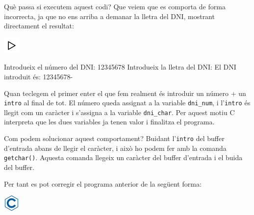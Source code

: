\documentclass[]{book}
\newenvironment{Shaded}{\begin{snugshade}}{\end{snugshade}}
\newcommand{\DataTypeTok}[1]{\textcolor[rgb]{0.13,0.29,0.53}{#1}}
\newcommand{\DecValTok}[1]{\textcolor[rgb]{0.00,0.00,0.81}{#1}}
\newcommand{\SpecialCharTok}[1]{\textcolor[rgb]{0.00,0.00,0.00}{#1}}
\newcommand{\StringTok}[1]{\textcolor[rgb]{0.31,0.60,0.02}{#1}}
\newcommand{\ImportTok}[1]{#1}
\newcommand{\CommentTok}[1]{\textcolor[rgb]{0.56,0.35,0.01}{\textit{#1}}}
\newcommand{\ControlFlowTok}[1]{\textcolor[rgb]{0.13,0.29,0.53}{\textbf{#1}}}
\newcommand{\PreprocessorTok}[1]{\textcolor[rgb]{0.56,0.35,0.01}{\textit{#1}}}
\newcommand{\NormalTok}[1]{#1}
\begin{document}
Què passa si executem aquest codi? Que veiem que es comporta de forma
incorrecta, ja que no ens arriba a demanar la lletra del DNI, mostrant
directament el resultat:

\includegraphics{./img/play.png}

\begin{Shaded}
\begin{Highlighting}[]
\NormalTok{Introdueix el número del DNI: }\DecValTok{12345678}
\NormalTok{Introdueix la lletra del DNI:}
\NormalTok{El DNI introduit és: }\DecValTok{12345678}\NormalTok{-}
\end{Highlighting}
\end{Shaded}

Quan teclegem el primer enter el que fem realment és introduir un número
+ un \texttt{intro} al final de tot. El número queda assignat a la
variable \texttt{dni\_num}, i l'\texttt{intro} és llegit com un caràcter
i s'assigna a la variable \texttt{dni\_char}. Per aquest motiu C
interpreta que les dues variables ja tenen valor i finalitza el
programa.

Com podem solucionar aquest comportament? Buidant l'\texttt{intro} del
buffer d'entrada abans de llegir el caràcter, i això ho podem fer amb la
comanda \texttt{getchar()}. Aquesta comanda llegeix un caràcter del
buffer d'entrada i el buida del buffer.

Per tant es pot corregir el programa anterior de la següent forma:

\includegraphics{./img/c.png}

\begin{Shaded}
\end{Shaded}
\end{document}
